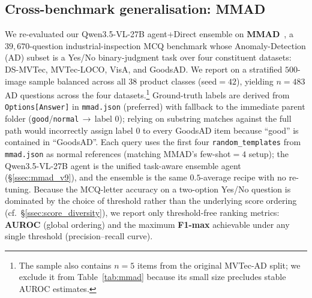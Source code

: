 \subsection{Cross-benchmark generalisation: MMAD}
\label{ssec:mmad}

We re-evaluated our Qwen3.5-VL-27B agent+Direct ensemble on \textbf{MMAD}~\citep{jiang2024mmad}, a $39{,}670$-question industrial-inspection MCQ benchmark whose Anomaly-Detection (AD) subset is a Yes/No binary-judgment task over four constituent datasets: DS-MVTec, MVTec-LOCO, VisA, and GoodsAD. We report on a stratified $500$-image sample balanced across all $38$ product classes (seed$=42$), yielding $n{=}483$ AD questions across the four datasets.\footnote{The sample also contains $n{=}5$ items from the original MVTec-AD split; we exclude it from Table~\ref{tab:mmad} because its small size precludes stable AUROC estimates.} Ground-truth labels are derived from \texttt{Options[Answer]} in \texttt{mmad.json} (preferred) with fallback to the immediate parent folder (\texttt{good}/\texttt{normal}$\,\to\,$label $0$); relying on substring matches against the full path would incorrectly assign label $0$ to every GoodsAD item because ``good'' is contained in ``GoodsAD''. Each query uses the first four \texttt{random\_templates} from \texttt{mmad.json} as normal references (matching MMAD's few-shot$=4$ setup); the Qwen3.5-VL-27B agent is the unified task-aware ensemble agent (\S\ref{ssec:mmad_v9}), and the ensemble is the same $0.5$-average recipe with no re-tuning. Because the MCQ-letter accuracy on a two-option Yes/No question is dominated by the choice of threshold rather than the underlying score ordering (cf.~\S\ref{ssec:score_diversity}), we report only threshold-free ranking metrics: \textbf{AUROC} (global ordering) and the maximum \textbf{F1-max} achievable under any single threshold (precision--recall curve).

